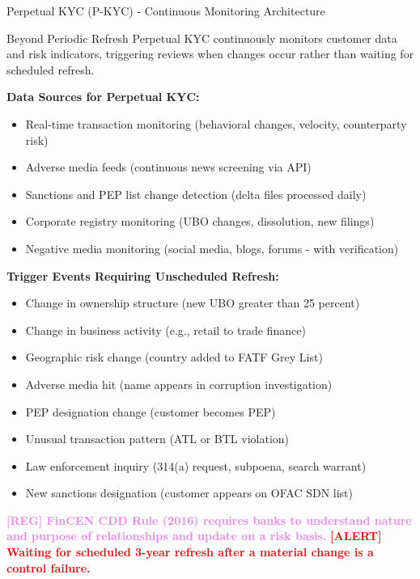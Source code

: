 \documentclass[11pt,a4paper]{beamer}
\newcommand{\redflag}[1]{\textcolor{red}{\textbf{[ALERT] #1}}}
\newcommand{\regcite}[1]{\textcolor{violet}{\textbf{[REG] #1}}}
\begin{document}
	\begin{frame}{Perpetual KYC (P-KYC) - Continuous Monitoring Architecture}
		\begin{block}{Beyond Periodic Refresh}
			Perpetual KYC continuously monitors customer data and risk indicators, triggering reviews when changes occur rather than waiting for scheduled refresh.
		\end{block}
		
		\textbf{Data Sources for Perpetual KYC:}
		\begin{itemize}
			\item Real-time transaction monitoring (behavioral changes, velocity, counterparty risk)
			\item Adverse media feeds (continuous news screening via API)
			\item Sanctions and PEP list change detection (delta files processed daily)
			\item Corporate registry monitoring (UBO changes, dissolution, new filings)
			\item Negative media monitoring (social media, blogs, forums - with verification)
		\end{itemize}
		
		\textbf{Trigger Events Requiring Unscheduled Refresh:}
		\begin{itemize}
			\item Change in ownership structure (new UBO greater than 25 percent)
			\item Change in business activity (e.g., retail to trade finance)
			\item Geographic risk change (country added to FATF Grey List)
			\item Adverse media hit (name appears in corruption investigation)
			\item PEP designation change (customer becomes PEP)
			\item Unusual transaction pattern (ATL or BTL violation)
			\item Law enforcement inquiry (314(a) request, subpoena, search warrant)
			\item New sanctions designation (customer appears on OFAC SDN list)
		\end{itemize}
		
		\regcite{FinCEN CDD Rule (2016) requires banks to understand nature and purpose of relationships and update on a risk basis.}
		\redflag{Waiting for scheduled 3-year refresh after a material change is a control failure.}
	\end{frame}
	
\end{document}
